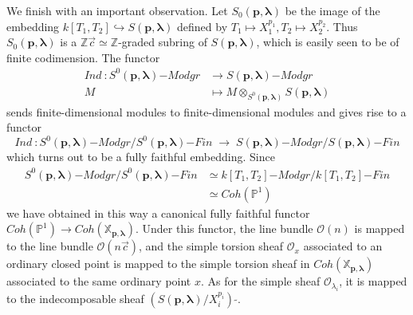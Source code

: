\documentclass[a4paper,10pt]{amsart}
\def\Z{\mathbb{Z}}
\def\O{\mathcal{O}}
\def\p{\mathbf{p}}
\def\xpl{\mathbb{X}_{\mathbf{p},\boldsymbol{\lambda}}}
\def\llambda{\boldsymbol{\lambda}}
\numberwithin{equation}{section}
\begin{document}
{We finish with an important observation. Let ${S}_0(\p,\llambda)$ be the image of the embedding $k[T_1,T_2] \hookrightarrow {S}(\p,\llambda)$ defined by $T_1 \mapsto X_1^{p_1}, T_2 \mapsto X_2^{p_2}$. Thus ${S}_0(\p,\llambda)$ is a $\Z\vec{c}\simeq \Z$-graded subring of ${S}(\p,\llambda)$, which is easily seen to be of finite codimension. The functor
\begin{equation*}
\begin{split}
Ind~: {S}^0(\p,\llambda)\mathrm{-}Modgr &\to {S}(\p,\llambda)\mathrm{-}Modgr\\
M &\mapsto M \otimes_{{S}^0(\p,\llambda)} {S}(\p,\llambda)
\end{split}
\end{equation*}
sends finite-dimensional modules to finite-dimensional modules and gives rise to a functor
$$Ind~: {S}^0(\p,\llambda)\mathrm{-}Modgr/  {S}^0(\p,\llambda)\mathrm{-}Fin\;\to\; {S}(\p,\llambda)\mathrm{-}Modgr/{S}(\p,\llambda)\mathrm{-}Fin$$
which turns out to be a fully faithful embedding. Since
\begin{equation*}
\begin{split}
{S}^0(\p,\llambda)\mathrm{-}Modgr/  {S}^0(\p,\llambda)\mathrm{-}Fin &\simeq k[T_1,T_2]\mathrm{-}Modgr/k[T_1,T_2]\mathrm{-}Fin \\
 &\simeq Coh(\mathbb{P}^1)
\end{split}
\end{equation*}
we have obtained in this way a canonical fully faithful functor $Coh(\mathbb{P}^1) \to Coh(\xpl)$.
Under this functor, the line bundle $\O(n)$ is mapped to the line bundle $\O(n\vec{c})$, and the simple torsion sheaf $\O_x$ associated to an ordinary closed point is mapped to the simple torsion sheaf in $Coh(\xpl)$ associated to the same ordinary point $x$. As for the simple sheaf $\O_{\lambda_i}$, it is mapped to the indecomposable sheaf $({S}(\p,\llambda)/X_i^{p_i})\;\widetilde{}$.

\vspace{.15in}

\addtocounter{theo}{1}
}
\end{document}
